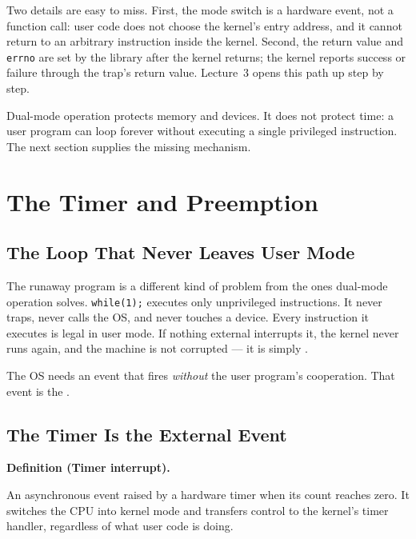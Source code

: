 \documentclass[11pt]{article}
\newenvironment{definitionbox}[1]{%
  \par\noindent\textbf{Definition (#1).}\ \itshape
}{\par\vspace{0.3em}}
\begin{document}
Two details are easy to miss. First, the mode switch is a hardware event, not a
function call: user code does not choose the kernel's entry address, and it
cannot return to an arbitrary instruction inside the kernel. Second, the return
value and \texttt{errno} are set by the library after the kernel returns; the
kernel reports success or failure through the trap's return value. Lecture~3
opens this path up step by step.

Dual-mode operation protects memory and devices. It does not protect time: a
user program can loop forever without executing a single privileged
instruction. The next section supplies the missing mechanism.

\section{The Timer and Preemption}
\noindent{}

\subsection{The Loop That Never Leaves User Mode}

The runaway program is a different kind of problem from the ones dual-mode
operation solves. \texttt{while(1);} executes only unprivileged instructions.
It never traps, never calls the OS, and never touches a device. Every
instruction it executes is legal in user mode. If nothing external interrupts
it, the kernel never runs again, and the machine is not corrupted --- it is
simply .

The OS needs an event that fires \emph{without} the user program's cooperation.
That event is the .

\subsection{The Timer Is the External Event}

\begin{definitionbox}{Timer interrupt}
An asynchronous event raised by a hardware timer when its count reaches zero.
It switches the CPU into kernel mode and transfers control to the kernel's
timer handler, regardless of what user code is doing.
\end{definitionbox}
\end{document}
